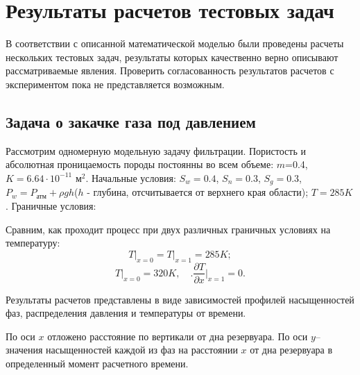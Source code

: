%
\section{Результаты расчетов тестовых задач}
%
В соответствии с описанной математической моделью были проведены расчеты
нескольких тестовых задач, результаты которых качественно верно описывают
рассматриваемые явления. Проверить согласованность результатов расчетов с
экспериментом пока не представляется возможным.

\subsection{Задача о закачке газа под давлением}
Рассмотрим одномерную модельную задачу фильтрации. Пористость и
абсолютная проницаемость породы постоянны во всем объеме:  $m$=0.4,\; $K=6.64\cdot 10^{-11}$ м$^2$.
Начальные условия:\; $S_w=0.4$,\; $S_n=0.3$,\; $S_g=0.3$, 
$P_w=P_\text{атм}+\rho g h$($h$ - глубина, отсчитывается от верхнего края области);
$T=285K$. Граничные условия:

Сравним, как проходит процесс при двух различных граничных
условиях на температуру:
\begin{equation} \label{noT} \left.T\right|_{x=0}=\left.T\right|_{x=1}=285K; \end{equation}
\begin{equation} \label{T} \left.T\right|_{x=0}=320K,\quad \Biggl.\dfrac{\partial{T}}{\partial{x}}\Biggr|_{x=1}=0. \end{equation}

Результаты расчетов представлены в виде зависимостей профилей насыщенностей фаз,
распределения давления и температуры от времени.

По оси $x$ отложено расстояние по вертикали от дна резервуара. По оси $y$--
значения насыщенностей каждой из фаз на расстоянии $x$ от дна резервуара
в определенный момент расчетного времени.

